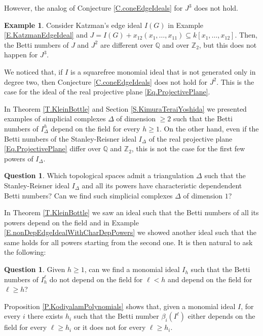 \documentclass[11pt,oneside]{amsart}
\theoremstyle{plain}
\theoremstyle{definition}
\newtheorem{example}[theorem]{Example}
\newtheorem{question}[theorem]{Question}
\newcommand{\Q}{\mathbb{Q}}
\newcommand{\Z}{\mathbb{Z}}
\begin{document}
However, the analog of Conjecture \ref{C.coneEdgeIdeals} for $J^3$ does not hold.

\begin{example}
Consider Katzman's edge ideal $I(G)$ in Example \ref{E.KatzmanEdgeIdeal} and $J = I(G) + x_{12}(x_1,\dots,x_{11}) \subseteq k[x_1,\dots,x_{12}]$. Then, the Betti numbers of $J$ and $J^2$ are different over $\Q$ and over $\Z_2$, but this does not happen for $J^3$.
\end{example}

We noticed that, if $I$ is a squarefree monomial ideal that is not generated only in degree two, then Conjecture \ref{C.coneEdgeIdeals} does not hold for $J^2$. This is the case for the ideal of the real projective plane \eqref{Eq.ProjectivePlane}.

\medskip

In Theorem \ref{T.KleinBottle} and Section \ref{S.KimuraTeraiYoshida} we presented examples of simplicial complexes $\Delta$ of dimension $\geq 2$ such that the Betti numbers of $I_\Delta^h$ depend on the field for every $h \geq 1$. On the other hand, even if the Betti numbers of the Stanley-Reisner ideal $I_\Delta$ of the real projective plane \eqref{Eq.ProjectivePlane} differ over $\Q$ and $\Z_2$, this is not the case for the first few powers of $I_\Delta$.

\begin{question}
Which topological spaces admit a triangulation $\Delta$ such that the Stanley-Reisner ideal $I_\Delta$ and all its powers have characteristic dependendent Betti numbers?
Can we find such simplicial complexes $\Delta$ of dimension $1$?
\end{question}


In Theorem \ref{T.KleinBottle} we saw an ideal such that the Betti numbers of all its powers depend on the field and in Example \ref{E.nonDepEdgeIdealWithCharDepPowers} we showed another ideal such that the same holds for all powers starting from the second one. It is then natural to ask the following:

\begin{question}
Given $h \geq 1$, can we find a monomial ideal $I_h$ such that the Betti numbers of $I_h^\ell$ do not depend on the field for $\ell < h$ and depend on the field for $\ell \geq h$?
\end{question}

Proposition \ref{P.KodiyalamPolynomials} shows that, given a monomial ideal $I$, for every $i$ there exists $h_i$ such that the Betti number $\beta_i(I^\ell)$ either depends on the field for every $\ell \geq h_i$ or it does not for every $\ell \geq h_i$. 
\end{document}
